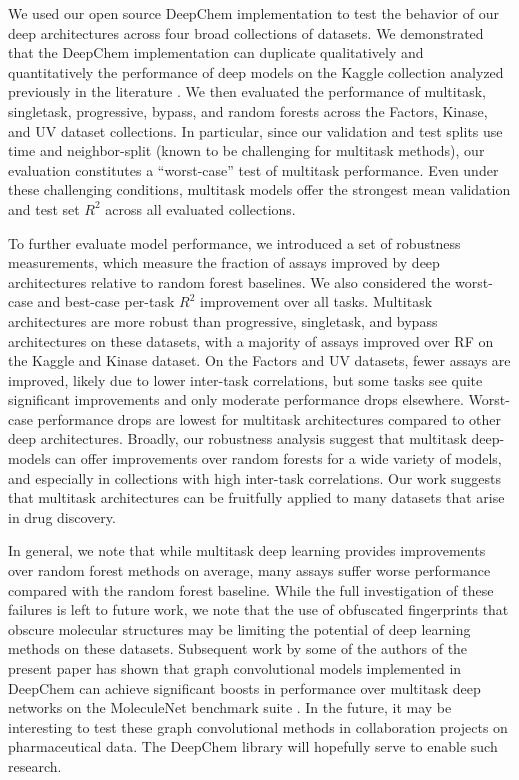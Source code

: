 We used our open source DeepChem implementation to test the behavior of our deep architectures across four broad collections of datasets. We demonstrated that the DeepChem implementation can duplicate qualitatively and quantitatively the performance of deep models on the Kaggle collection analyzed previously in the literature \cite{ma2015deep}. We then evaluated the performance of multitask, singletask, progressive, bypass, and random forests across the Factors, Kinase, and UV dataset collections. In particular, since our validation and test splits use time and neighbor-split (known to be challenging for multitask methods), our evaluation constitutes a ``worst-case'' test of multitask performance. Even under these challenging conditions, multitask models offer the strongest mean validation and test set $R^2$ across all evaluated collections. 

To further evaluate model performance, we introduced a set of robustness measurements, which measure the fraction of assays improved by deep architectures relative to random forest baselines. We also considered the worst-case and best-case per-task $R^2$ improvement over all tasks. Multitask architectures are more robust than progressive, singletask, and bypass architectures on these datasets, with a majority of assays improved over RF on the Kaggle and Kinase dataset. On the Factors and UV datasets, fewer assays are improved, likely due to lower inter-task correlations, but some tasks see quite significant improvements and only moderate performance drops elsewhere. Worst-case performance drops are lowest for multitask architectures compared to other deep architectures. Broadly, our robustness analysis suggest that multitask deep-models can offer improvements over random forests for a wide variety of models, and especially in collections with high inter-task correlations. Our work suggests that multitask architectures can be fruitfully applied to many datasets that arise in drug discovery.  


In general, we note that while multitask deep learning provides improvements over random forest methods on average, many assays suffer worse performance compared with the random forest baseline. While the full investigation of these failures is left to future work, we note that the use of obfuscated fingerprints that obscure molecular structures may be limiting the potential of deep learning methods on these datasets. Subsequent work by some of the authors of the present paper has shown that graph convolutional models \cite{duvenaud2015convolutional} implemented in DeepChem can achieve significant boosts in performance over multitask deep networks on the MoleculeNet benchmark suite \cite{wu2017moleculenet}. In the future, it may be interesting to test these graph convolutional methods in collaboration projects on pharmaceutical data. The DeepChem library will hopefully serve to enable such research.

